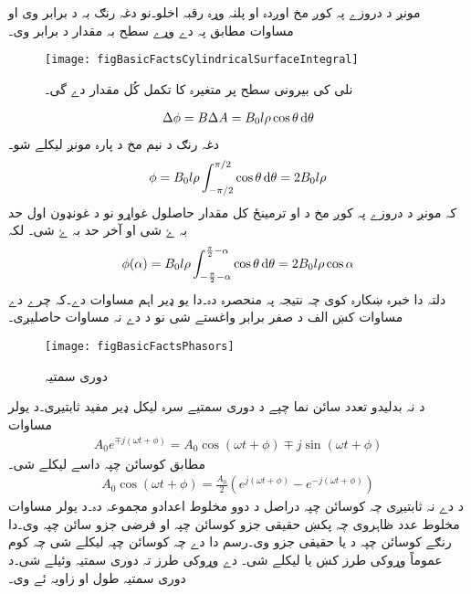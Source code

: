مونږ د دروزے پہ کوږ مخ  اوږدہ او  پلنہ  وړہ رقبہ  اخلو۔نو دغہ رنګ  بہ د  برابر وی او مساوات  مطابق پہ دے وړے سطح بہ  مقدار  د  برابر وی۔
\begin{figure}
\centering
\texttt{[image: figBasicFactsCylindricalSurfaceIntegral]}
\caption{نلی کی بیرونی سطح پر متغیرہ کا تکمل کُل مقدار دے گی۔}
\label{شکل_حقائق_نلکی_سطحی_تکمل}
\end{figure}
%
\begin{align}\label{مساوات_بنیادی_چوٹے_رقبے_پر_بہاو}
\Delta \phi=B \Delta A=B_0 l \rho \cos \theta \dif \theta
\end{align}
دغہ رنګ د نیم مخ د پارہ مونږ لیکلے شو۔
\begin{align}\label{مساوات_بنیادی_بہاو_بذریع_تکمل_زاویہ_صفر}
\phi = B_0 l \rho \int_{-\pi/2}^{\pi/2} \cos \theta \dif \theta =2 B_0 l \rho
\end{align}
کہ مونږ د دروزے پہ کوږ مخ د  او  ترمینځ کل مقدار حاصلول غواړو نو د غونډون اول حد بہ ۓ  شی او آخر حد بہ ۓ  شی۔ لکہ
\begin{align}\label{مساوات_بنیادی_بہاو_بذریع_تکمل_کوئی_زاویہ}
\phi (\alpha) = B_0 l \rho \int_{-\frac{\pi}{2}-\alpha}^{\frac{\pi}{2}-\alpha} \cos \theta \dif \theta =2 B_0 l \rho \cos \alpha
\end{align}
 دلتہ  دا خبرہ ښکارہ کوی چہ نتیجہ پہ  منحصرہ دہ۔دا یو ډیر اہم مساوات دے۔کہ چرے  دے مساوات کښ الف د صفر برابر واغستے شی نو د دے نہ مساوات  حاصلیږی۔ 
\begin{figure}
\centering
\texttt{[image: figBasicFactsPhasors]}
\caption{دوری سمتیہ}
\label{شکل_حقائق_دوری_سمتیات}
\end{figure}

د نہ بدلیدو تعدد سائن نما چپے  د دوری سمتیے سرہ لیکل ډیر مفید ثابتیږی۔د یولر مساوات
\begin{align}
A_0 e^{\mp j (\omega t + \phi)}=A_0 \cos (\omega t +\phi) \mp j \sin (\omega t+\phi)
\end{align}
مطابق کوسائن چپہ داسے لیکلے شی۔
\begin{align}
A_0 \cos (\omega t +\phi)=\frac{A_0}{2} \left(e^{j(\omega t +\phi)} -e^{-j(\omega t +\phi)}\right)
\end{align}
د دے نہ ثابتیږی چہ کوسائن چپہ دراصل د دوو مخلوط اعدادو مجموعہ دہ۔د یولر مساوات مخلوط عدد ظاہروی چہ پکښ حقیقی جزو کوسائن چپہ او فرضی جزو سائن چپہ وی۔دا رنګے کوسائن چپہ د  یا  حقیقی جزو وی۔رسم دا دے چہ کوسائن چپہ  لیکلے شی چہ کوم عموماً وړوکی طرز کښ  یا  لیکلے شی۔
دے وړوکی طرز تہ دوری سمتیہ وئیلے شی۔د دوری سمتیہ طول  او زاویہ ئے  وی۔

